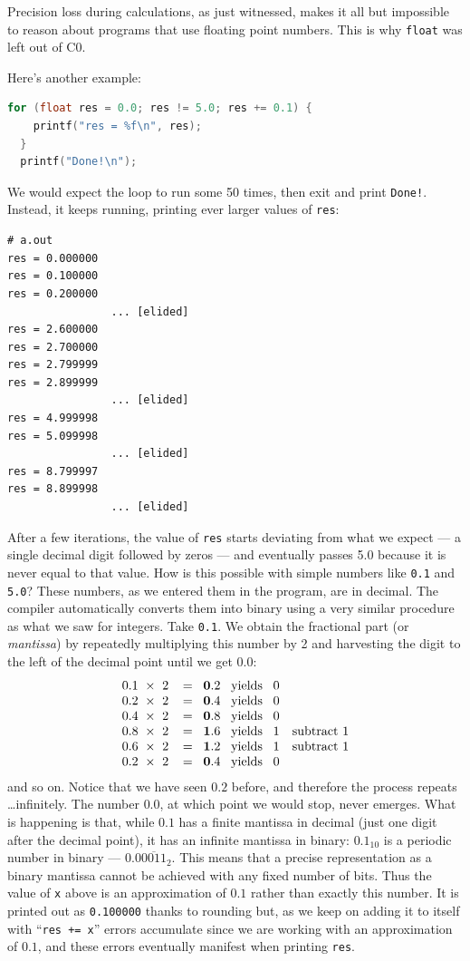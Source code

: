 Precision loss during calculations, as just witnessed, makes it all
but impossible to reason about programs that use floating point
numbers.  This is why \lstinline'float' was left out of C0.

Here's another example:
\begin{lstlisting}[language=c]
  for (float res = 0.0; res != 5.0; res += 0.1) {
    printf("res = %f\n", res);
  }
  printf("Done!\n");
\end{lstlisting}

We would expect the loop to run some 50 times, then exit and print
\lstinline'Done!'.  Instead, it keeps running, printing ever larger
values of \lstinline'res':
\begin{lstlisting}[language={[coin]C}]
# a.out
res = 0.000000
res = 0.100000
res = 0.200000
                ... [elided]
res = 2.600000
res = 2.700000
res = 2.799999
res = 2.899999
                ... [elided]
res = 4.999998
res = 5.099998
                ... [elided]
res = 8.799997
res = 8.899998
                ... [elided]
\end{lstlisting}
After a few iterations, the value of \lstinline'res' starts deviating
from what we expect --- a single decimal digit followed by zeros ---
and eventually passes 5.0 because it is never equal to that value.
How is this possible with simple numbers like \lstinline'0.1' and
\lstinline'5.0'?  These numbers, as we entered them in the program,
are in decimal.  The compiler automatically converts them into binary
using a very similar procedure as what we saw for integers.  Take
\lstinline'0.1'.  We obtain the fractional part (or \emph{mantissa})
by repeatedly multiplying this number by 2 and harvesting the digit to
the left of the decimal point until we get $0.0$:
$$
\begin{array}{l@{\;\;\times\;\; 2 \;\;\;=\;\;\;}l@{\;\;\;\text{yields}\;\;\;}ll}
   0.1 & \mathbf{0}.2  & 0
\\ 0.2 & \mathbf{0}.4  & 0
\\ 0.4 & \mathbf{0}.8  & 0
\\ 0.8 & \mathbf{1}.6  & 1 & \text{subtract 1}
\\ 0.6 & \mathbf{1}.2  & 1 & \text{subtract 1}
\\ 0.2 & \mathbf{0}.4  & 0
\end{array}
$$
and so on.  Notice that we have seen $0.2$ before, and therefore the process
repeats \ldots infinitely.  The number $0.0$, at which point we would
stop, never emerges.  What is happening is that, while $0.1$ has a
finite mantissa in decimal (just one digit after the decimal point),
it has an infinite mantissa in binary: $0.1_{10}$ is a periodic number
in binary --- $0.0\overline{0011}_2$.  This means that a precise
representation as a binary mantissa cannot be achieved with any fixed
number of bits.  Thus the value of \lstinline'x' above is an
approximation of $0.1$ rather than exactly this number.  It is printed
out as \lstinline'0.100000' thanks to rounding but, as we keep on
adding it to itself with ``\lstinline'res += x''' errors accumulate
since we are working with an approximation of $0.1$, and these errors
eventually manifest when printing \lstinline'res'.



